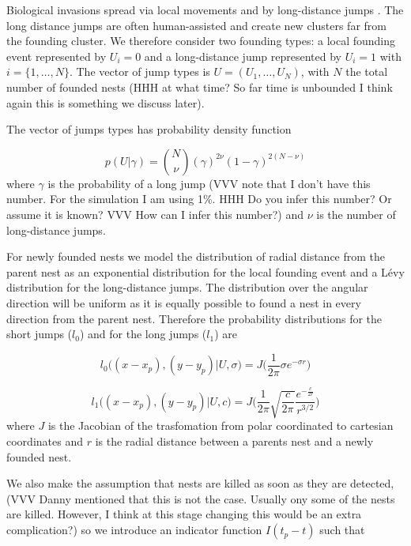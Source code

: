 \documentclass{article}
\begin{document}
Biological invasions spread via local movements and by long-distance jumps \cite{Suarez}. The long distance jumps are often human-assisted and create new clusters far from the founding cluster. We therefore consider two founding types: a local founding event represented by $U_i = 0$ and a long-distance jump represented by $U_i = 1$ with {\color{red}$i=\{1, \dots, N\}$}. The vector of jump types is $U = (U_1, \dots, U_N)$, with $N$ the total number of founded nests (HHH at what time? So far time is unbounded {\color{red}I think again this is something we discuss later}).

The vector of jumps types has probability density function

\begin{equation*}
    p(U| \gamma ) = {N \choose \nu}(\gamma)^{2\nu}(1 - \gamma)^{2(N - \nu)}
\end{equation*}
where $\gamma$ is the probability of a long jump (VVV note that I don't have this number. For the simulation I am using 1\%. HHH Do you infer this number? Or assume it is known? {\color{red} VVV How can I infer this number?}) and $\nu$ is the number of long-distance jumps.

For newly founded nests we model the distribution of radial distance from the parent nest as an exponential distribution for the local founding event and a L\'evy distribution for the long-distance jumps. The distribution over the angular direction will be uniform as it is equally possible to found a nest in every direction from the parent nest. Therefore the probability distributions for the short jumps ($l_0$) and for the long jumps ($l_1$) are

\begin{equation*}
    l_0\Big((x - x_p), (y - y_p) | U, \sigma \Big)= J \bigg(\frac{1}{2 \pi} \sigma e^{- \sigma r}\bigg)
\end{equation*}

\begin{equation*}
    l_1\Big((x - x_p), (y - y_p) | U, c \Big)= J \bigg(\frac{1}{2 \pi} \sqrt{\frac{c}{2 \pi}} \frac{e^{- \frac{c}{ 2 r}}}{r^{3/2}}\bigg)
\end{equation*}
where $J$ is the Jacobian {\color{red}of the trasfomation from polar coordinated to cartesian coordinates} and $r$ is the radial distance between a parents nest and a newly founded nest.

We also make the assumption that nests are killed as soon as they are detected, {\color{red} (VVV Danny mentioned that this is not the case. Usually ony some of the nests are killed. However, I think at this stage changing this would be an extra complication?)} so we introduce an indicator function $I(t_p - t)$ such that
\end{document}
